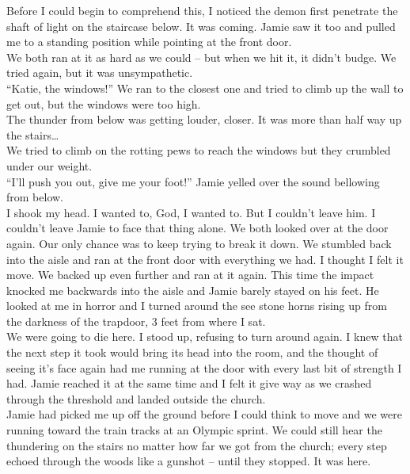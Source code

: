 \documentclass[a5paper]{scrartcl}
\begin{document}
Before I could begin to comprehend this, I noticed the demon first penetrate the shaft of light on the staircase below. It was coming. Jamie saw it too and pulled me to a standing position while pointing at the front door.\\


We both ran at it as hard as we could – but when we hit it, it didn't budge. We tried again, but it was unsympathetic.\\


\enquote{Katie, the windows!} We ran to the closest one and tried to climb up the wall to get out, but the windows were too high.\\


The thunder from below was getting louder, closer. It was more than half way up the stairs\dots\\


We tried to climb on the rotting pews to reach the windows but they crumbled under our weight.\\


\enquote{I'll push you out, give me your foot!} Jamie yelled over the sound bellowing from below.\\


I shook my head. I wanted to, God, I wanted to. But I couldn't leave him. I couldn't leave Jamie to face that thing alone. We both looked over at the door again. Our only chance was to keep trying to break it down. We stumbled back into the aisle and ran at the front door with everything we had. I thought I felt it move. We backed up even further and ran at it again. This time the impact knocked me backwards into the aisle and Jamie barely stayed on his feet. He looked at me in horror and I turned around the see stone horns rising up from the darkness of the trapdoor, 3 feet from where I sat. \\


We were going to die here. I stood up, refusing to turn around again. I knew that the next step it took would bring its head into the room, and the thought of seeing it's face again had me running at the door with every last bit of strength I had. Jamie reached it at the same time and I felt it give way as we crashed through the threshold and landed outside the church.\\


Jamie had picked me up off the ground before I could think to move and we were running toward the train tracks at an Olympic sprint. We could still hear the thundering on the stairs no matter how far we got from the church; every step echoed through the woods like a gunshot – until they stopped. It was here.\\
\end{document}
